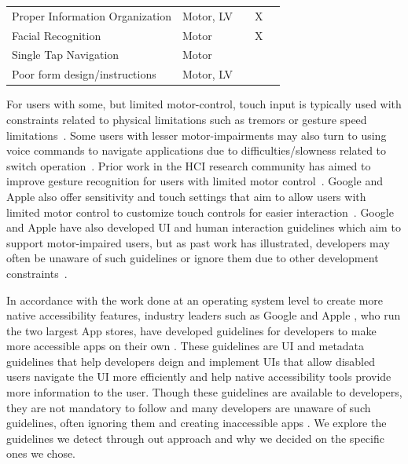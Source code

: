 \begin{table}[h]
\begin{tabular}{>{\centering\arraybackslash}p{2in}|>{\centering\arraybackslash}p{1.8in}|>{\centering\arraybackslash}p{.82in}|>{\centering\arraybackslash}p{.82in}|>{\centering\arraybackslash}p{.82in} }
		 Proper Information Organization & \footnotesize {Motor, LV} & \cite{Calvo16} & X & \\
		\rowcolor{gray!30!} Facial Recognition & \footnotesize {Motor} & \cite{Calvo16, Astler11} & X & \\
		 Single Tap Navigation & \footnotesize {Motor} & \cite{AppleAccess, GoogleAccess, HarvardAccess, WebGuide, FlrezAristizbal19, Milne18} &  & \\
		\rowcolor{gray!30!} Poor form design/instructions & \footnotesize {Motor, LV} & \cite{ADAWeb, AccessGov} &  & \\


		
			\end{tabular}
\vspace{-1em}
	\label{tab:guidelines}
\end{table}


For users with some, but limited motor-control, touch input is typically used with constraints related to physical limitations such as tremors or gesture speed limitations~\cite{Montague14}. Some users with lesser motor-impairments may also turn to using voice commands to navigate applications due to difficulties/slowness related to switch operation~\cite{Zhang13}. Prior work in the HCI research community has aimed to improve gesture recognition for users with limited motor control~\cite{Peng19}. Google and Apple also offer sensitivity and touch settings that aim to allow users with limited motor control to customize touch controls for easier interaction~\cite{Peng19,AppleAccess,GoogleAccess}. Google and Apple \cite{AppleAccess,GoogleAccess} have also developed UI and human interaction guidelines which aim to support motor-impaired users, but as past work has illustrated, developers may often be unaware of such guidelines or ignore them due to other development constraints~\cite{Salehnamadi21}.

In accordance with the work done at an operating system level to create more native accessibility features, industry leaders such as Google and Apple \cite{AppleAccess,GoogleAccess}, who run the two largest App stores, have developed guidelines for developers to make more accessible apps on their own \cite{IOSDesign, ANDRDesign}. These guidelines are UI and metadata guidelines that help developers deign and implement UIs that allow disabled users navigate the UI more efficiently and help native accessibility tools provide more information to the user. Though these guidelines are available to developers, they are not mandatory to follow and many developers are unaware of such guidelines, often ignoring them and creating inaccessible apps \cite{Salehnamadi21}. We explore the guidelines we detect through out approach and why we decided on the specific ones we chose. 

